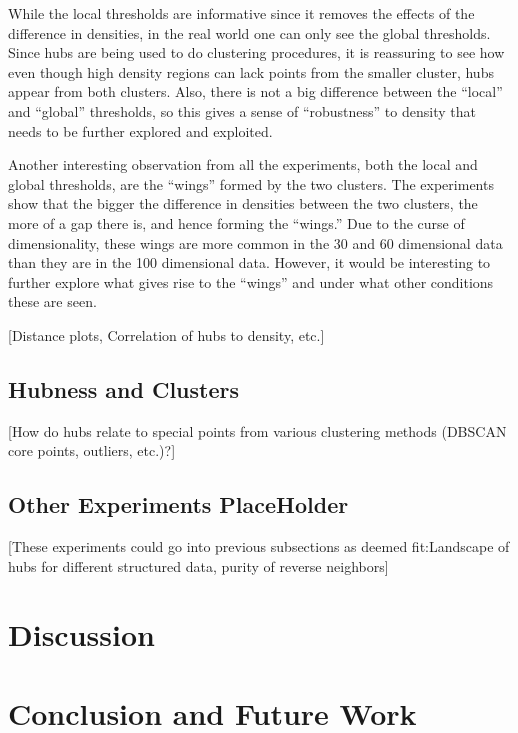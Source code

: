 \documentclass[graybox]{svmult}
\begin{document}
While the local thresholds are informative since it removes the effects of the difference in densities, in the real world one can only see the global thresholds. Since hubs are being used to do clustering procedures, it is reassuring to see how even though high density regions can lack points from the smaller cluster, hubs appear from both clusters. Also, there is not a big difference between the ``local'' and ``global'' thresholds, so this gives a sense of ``robustness'' to density that needs to be further explored and exploited.

Another interesting observation from all the experiments, both the local and global thresholds, are the ``wings'' formed by the two clusters. The experiments show that the bigger the difference in densities between the two clusters, the more of a gap there is, and hence forming the ``wings.'' Due to the curse of dimensionality, these wings are more common in the 30 and 60 dimensional data than they are in the 100 dimensional data. However, it would be interesting to further explore what gives rise to the ``wings'' and under what other conditions these are seen.

[Distance plots, Correlation of hubs to density, etc.]

\subsection{Hubness and Clusters}
\label{sec:4.2}
        
[How do hubs relate to special points from various clustering methods (DBSCAN core points, outliers, etc.)?]

\subsection{Other Experiments PlaceHolder}
[These experiments could go into previous subsections as deemed fit:Landscape of hubs for different structured data, purity of reverse neighbors]

\section{Discussion}
\label{sec:5}



\section{Conclusion and Future Work}
\label{sec:6}

%
\end{document}

